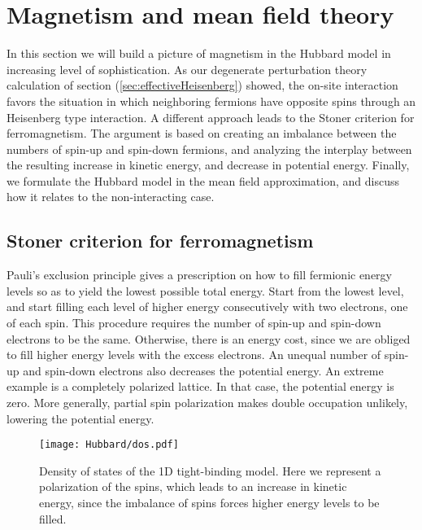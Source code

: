 \section{Magnetism and mean field theory}\label{sec:magMFT}

In this section we will build a picture of magnetism in the Hubbard model in increasing level of sophistication.
As our degenerate perturbation theory  calculation of section (\ref{sec:effectiveHeisenberg}) showed, the on-site interaction favors the situation in which neighboring fermions have opposite spins through an Heisenberg type interaction.
A different approach leads to the Stoner criterion for ferromagnetism.
The argument is based on creating an imbalance between the numbers of spin-up and spin-down fermions, and analyzing the interplay between the resulting increase in kinetic energy, and decrease in potential energy.
Finally, we formulate the Hubbard model in the mean field approximation, and discuss how it relates to the non-interacting case.

\subsection{Stoner criterion for ferromagnetism}
\label{subsec:stoner}

Pauli's exclusion principle gives a prescription on how to fill fermionic energy levels so as to yield the lowest possible total energy.
Start from the lowest level, and start filling each level of higher energy consecutively with two electrons, one of each spin.
This procedure requires the number of spin-up and spin-down electrons to be the same.
Otherwise, there is an energy cost, since we are obliged to fill higher energy levels with the excess electrons.
An unequal number of spin-up and spin-down electrons also decreases the potential energy.
An extreme example is a completely polarized lattice.
In that case, the potential energy is zero.
More generally, partial spin polarization makes double occupation unlikely, lowering the potential energy.

\begin{figure}[H]
	\centering
\hspace{12mm}\texttt{[image: Hubbard/dos.pdf]}
	\caption[Density of states of the \acs{1D} tight-binding model.]{Density of states of the \acs{1D} tight-binding model.
	Here we represent a polarization of the spins, which leads to an increase in kinetic energy, since the imbalance of spins forces higher energy levels to be filled.}
	\label{fig:dos}
\end{figure}

